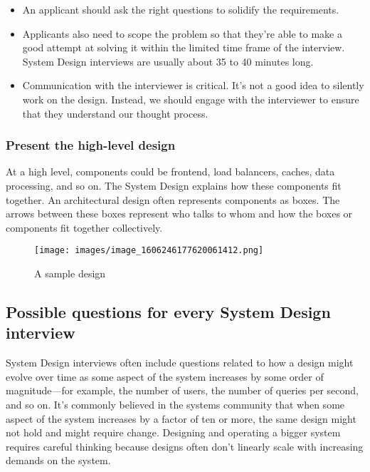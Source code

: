 \begin{itemize} \item {}\label{BkHabk7AURmxR6IR-ch_a} An applicant should ask the right questions to solidify the requirements. \item {}\label{tMnQnmcrx93uB5IFGVFMX} Applicants also need to scope the problem so that they're able to make a good attempt at solving it within the limited time frame of the interview. System Design interviews are usually about 35 to 40 minutes long. \item {}\label{CncjPzeO-3fVJ2QM2o_ip} Communication with the interviewer is critical. It's not a good idea to silently work on the design. Instead, we should engage with the interviewer to ensure that they understand our thought process. \end{itemize} \subsubsection{Present the high-level design}\label{RwSzNg6izH6FhCXOl7kS4} At a high level, components could be frontend, load balancers, caches, data processing, and so on. The System Design explains how these components fit together. An architectural design often represents components as boxes. The arrows between these boxes represent who talks to whom and how the boxes or components fit together collectively.

\begin{figure}[htbp]
    \centering
    \texttt{[image: images/image\_1606246177620061412.png]}
    \caption{A sample design}
\end{figure}

\subsection{Possible questions for every System Design interview}\label{N0oqEUUvDaJbCsC9k12Oe} System Design interviews often include questions related to how a design might evolve over time as some aspect of the system increases by some order of magnitude---for example, the number of users, the number of queries per second, and so on. It's commonly believed in the systems community that when some aspect of the system increases by a factor of ten or more, the same design might not hold and might require change. Designing and operating a bigger system requires careful thinking because designs often don't linearly scale with increasing demands on the system.

